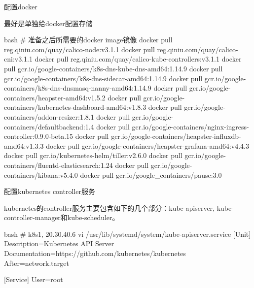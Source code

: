 \begin{outline}[enumerate]
  \1 配置docker

最好是单独给docker配置存储
\begin{code-block}{bash}
# 准备之后所需要的docker image镜像
docker pull reg.qiniu.com/quay/calico-node:v3.1.1
docker pull reg.qiniu.com/quay/calico-cni:v3.1.1
docker pull reg.qiniu.com/quay/calico-kube-controllers:v3.1.1
docker pull gcr.io/google-containers/k8s-dns-kube-dns-amd64:1.14.9
docker pull gcr.io/google-containers/k8s-dns-sidecar-amd64:1.14.9
docker pull gcr.io/google-containers/k8s-dns-dnsmasq-nanny-amd64:1.14.9
docker pull gcr.io/google-containers/heapster-amd64:v1.5.2
docker pull gcr.io/google-containers/kubernetes-dashboard-amd64:v1.8.3
docker pull gcr.io/google-containers/addon-resizer:1.8.1
docker pull gcr.io/google-containers/defaultbackend:1.4
docker pull gcr.io/google-containers/nginx-ingress-controller:0.9.0-beta.15
docker pull gcr.io/google-containers/heapster-influxdb-amd64:v1.3.3
docker pull gcr.io/google-containers/heapster-grafana-amd64:v4.4.3
docker pull gcr.io/kubernetes-helm/tiller:v2.6.0
docker pull gcr.io/google-containers/fluentd-elasticsearch:1.24
docker pull gcr.io/google-containers/kibana:v5.4.0
docker pull gcr.io/google_containers/pause:3.0
\end{code-block}

  \1 配置kubernetes controller服务

kubernetes的controller服务主要包含如下的几个部分：kube-apiserver, kube-controller-manager和kube-scheduler。
\begin{code-block}{bash}
# k8s1, 20.30.40.6
vi /usr/lib/systemd/system/kube-apiserver.service
[Unit]
Description=Kubernetes API Server
Documentation=https://github.com/kubernetes/kubernetes
After=network.target

[Service]
User=root


\end{code-block}
\end{outline}
